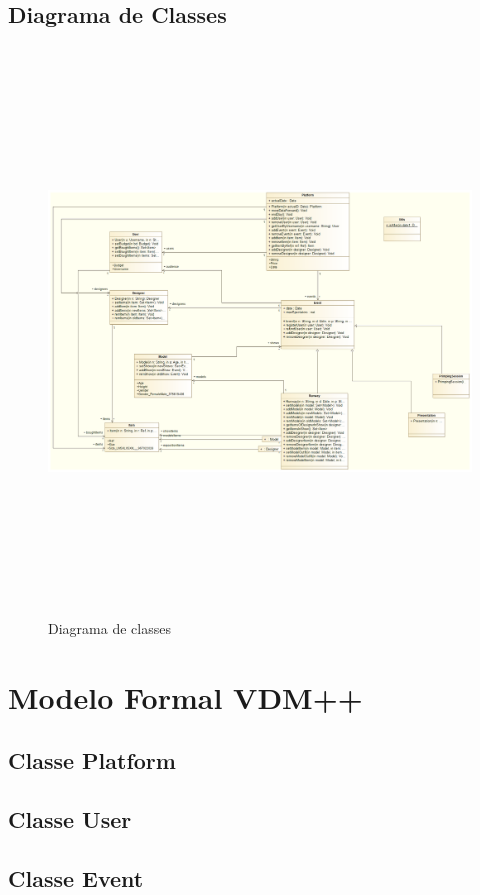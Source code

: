 \documentclass{article}
\begin{document}
\subsection{Diagrama de Classes}
\begin{figure}[H]
\centering
\includegraphics[width=160mm,height=150mm]{./images/class_diagram.png}
\caption{Diagrama de classes}
\label{fig:method}
\end{figure}
		
\section{Modelo Formal VDM++}
\subsection{Classe Platform}


\subsection{Classe User}


\subsection{Classe Event}
\end{document}
